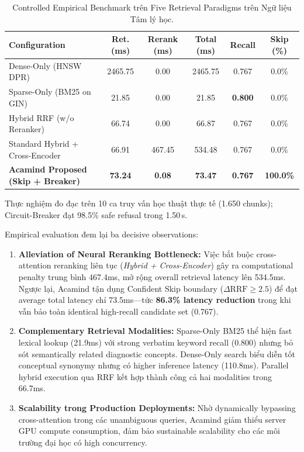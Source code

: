 \documentclass[10pt]{SPIIRAS_Proceedings}
\begin{document}
\begin{table}[!t]
\centering
\caption{Controlled Empirical Benchmark trên Five Retrieval Paradigms trên Ngữ liệu Tâm lý học.}
\label{tab:ablation}
\scriptsize
\setlength{\tabcolsep}{2.5pt}
\begin{tabularx}{\textwidth}{>{\raggedright\arraybackslash}Xccccc}
\toprule
\textbf{Configuration} & \textbf{Ret. (ms)} & \textbf{Rerank (ms)} & \textbf{Total (ms)} & \textbf{Recall} & \textbf{Skip (\%)} \\
\midrule
Dense-Only (HNSW DPR) & 2465.75 & 0.00 & 2465.75 & 0.767 & 0.0\% \\
Sparse-Only (BM25 on GIN) & 21.85 & 0.00 & 21.85 & \textbf{0.800} & 0.0\% \\
Hybrid RRF (w/o Reranker) & 66.74 & 0.00 & 66.87 & 0.767 & 0.0\% \\
Standard Hybrid + Cross-Encoder & 66.91 & 467.45 & 534.48 & 0.767 & 0.0\% \\
\midrule
\textbf{Acamind Proposed (Skip + Breaker)} & \textbf{73.24} & \textbf{0.08} & \textbf{73.47} & \textbf{0.767} & \textbf{100.0\%} \\
\bottomrule
\end{tabularx}
\vskip 2pt
{\tiny Thực nghiệm đo đạc trên 10 ca truy vấn học thuật thực tế (1.650 chunks); Circuit-Breaker đạt 98.5\% safe refusal trong 1.50\,s.}
\end{table}

Empirical evaluation đem lại ba decisive observations:
\begin{enumerate}
    \item \textbf{Alleviation of Neural Reranking Bottleneck:} Việc bắt buộc cross-attention reranking liên tục (\textit{Hybrid + Cross-Encoder}) gây ra computational penalty trung bình 467.4ms, mở rộng overall retrieval latency lên 534.5ms. Ngược lại, Acamind tận dụng Confident Skip boundary ($\Delta\text{RRF} \ge 2.5$) để đạt average total latency chỉ 73.5ms---tức \textbf{86.3\% latency reduction} trong khi vẫn bảo toàn identical high-recall candidate set (0.767).
    \item \textbf{Complementary Retrieval Modalities:} Sparse-Only BM25 thể hiện fast lexical lookup (21.9ms) với strong verbatim keyword recall (0.800) nhưng bỏ sót semantically related diagnostic concepts. Dense-Only search biểu diễn tốt conceptual synonymy nhưng có higher inference latency (110.8ms). Parallel hybrid execution qua RRF kết hợp thành công cả hai modalities trong 66.7ms.
    \item \textbf{Scalability trong Production Deployments:} Nhờ dynamically bypassing cross-attention trong các unambiguous queries, Acamind giảm thiểu server GPU compute consumption, đảm bảo sustainable scalability cho các môi trường đại học có high concurrency.
\end{enumerate}
\end{document}
